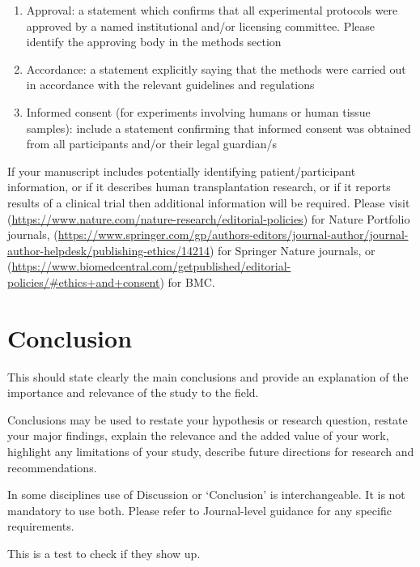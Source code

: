 \documentclass[sn-apa,referee,pdflatex]{sn-jnl}
\begin{document}
\begin{enumerate}
\def\labelenumi{\arabic{enumi}.}
\item
  Approval: a statement which confirms that all experimental protocols
  were approved by a named institutional and/or licensing committee.
  Please identify the approving body in the methods section
\item
  Accordance: a statement explicitly saying that the methods were
  carried out in accordance with the relevant guidelines and regulations
\item
  Informed consent (for experiments involving humans or human tissue
  samples): include a statement confirming that informed consent was
  obtained from all participants and/or their legal guardian/s
\end{enumerate}

If your manuscript includes potentially identifying patient/participant
information, or if it describes human transplantation research, or if it
reports results of a clinical trial then additional information will be
required. Please visit
(\url{https://www.nature.com/nature-research/editorial-policies}) for
Nature Portfolio journals,
(\url{https://www.springer.com/gp/authors-editors/journal-author/journal-author-helpdesk/publishing-ethics/14214})
for Springer Nature journals, or
(\url{https://www.biomedcentral.com/getpublished/editorial-policies/\#ethics+and+consent})
for BMC.

\hypertarget{sec13}{%
\section{Conclusion}\label{sec13}}

This should state clearly the main conclusions and provide an
explanation of the importance and relevance of the study to the field.

Conclusions may be used to restate your hypothesis or research question,
restate your major findings, explain the relevance and the added value
of your work, highlight any limitations of your study, describe future
directions for research and recommendations.

In some disciplines use of Discussion or `Conclusion' is
interchangeable. It is not mandatory to use both. Please refer to
Journal-level guidance for any specific requirements.

This is a test \citet{felix2023} to check if they show up.

\backmatter

\end{document}
